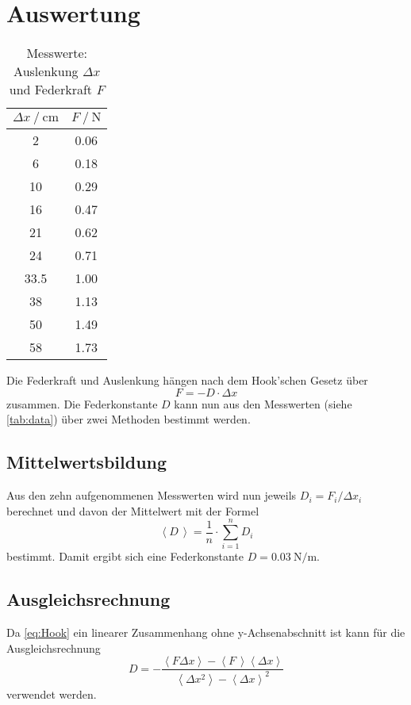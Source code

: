 \section{Auswertung}
\label{sec:Auswertung}
\begin{table}
  \centering
  \caption{Messwerte: Auslenkung $\Delta x $ und Federkraft $F$}
  \label{tab:data}
  \begin{tabular}{c c}
    \toprule 
    $\Delta x \:/\: \si{\centi\meter}$ & $F \:/\: \si{\newton}$ \\ 
    \midrule 
    2 & 0.06 \\
    6 & 0.18 \\
    10 & 0.29 \\
    16 & 0.47 \\
    21 & 0.62 \\
    24 & 0.71 \\
    33.5 & 1.00 \\
    38 & 1.13 \\
    50 & 1.49 \\
    58 & 1.73 \\ 
    \bottomrule
  \end{tabular}
\end{table} 
\noindent Die Federkraft und Auslenkung hängen nach dem Hook'schen Gesetz über
\begin{equation}
  \label{eq:Hook}
  F = - D \cdot \Delta x
\end{equation}
zusammen.
Die Federkonstante $D$ kann nun aus den Messwerten (siehe \autoref{tab:data}) über zwei Methoden bestimmt werden.

\newpage

\subsection{Mittelwertsbildung}
Aus den zehn aufgenommenen Messwerten wird nun jeweils $D_i = F_i / \Delta x_i$ berechnet und davon der Mittelwert mit der Formel
\begin{equation}
  \label{eq:Mittelwert}
  \left< D \, \right> = \frac{1}{n} \cdot \sum_{i=1}^{n} D_i
\end{equation}
bestimmt. Damit ergibt sich eine Federkonstante $D = \SI{0.03}{\newton\per\meter}$.

\subsection{Ausgleichsrechnung}

Da \autoref{eq:Hook} ein linearer Zusammenhang ohne y-Achsenabschnitt ist kann für die Ausgleichsrechnung
\begin{equation}
  \label{eq:Lin-Ausgleich}
  D = - \frac
  {\left< F \Delta x \right> - \left< F \, \right> \left< \Delta x \right>}
  {\left< \Delta x^2 \right> - \left< \Delta x \right> ^2}
\end{equation}
verwendet werden.

